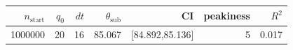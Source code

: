 \begin{tabular}{r r r r r r r}
\hline
$n_{\mathrm{start}}$ & $q_0$ & $dt$ & $\theta_{\mathrm{sub}}$ & CI & peakiness & $R^2$ \\
\hline
1000000 & 20 & 16 & 85.067 & [84.892,85.136] & 5 & 0.017 \\
\hline
\end{tabular}
